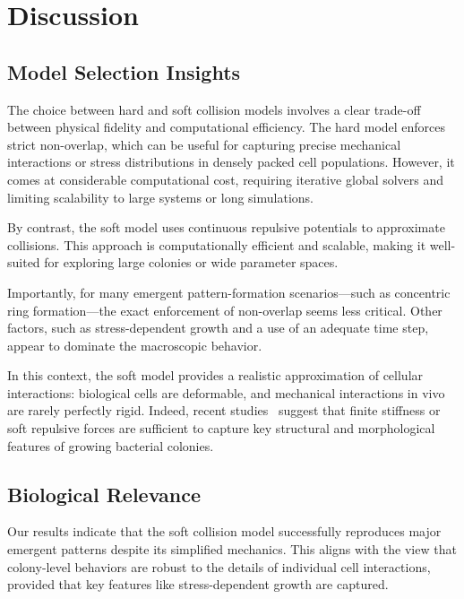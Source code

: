 \documentclass[conference]{IEEEtran}
\begin{document}
\clearpage
\newpage







\newpage
\clearpage

\section{Discussion}

\subsection{Model Selection Insights}

The choice between hard and soft collision models involves a clear trade-off between physical fidelity and computational efficiency.
The hard model enforces strict non-overlap, which can be useful for capturing precise mechanical interactions or stress distributions in densely packed cell populations. However, it comes at considerable computational cost, requiring iterative global solvers and limiting scalability to large systems or long simulations.

By contrast, the soft model uses continuous repulsive potentials to approximate collisions. This approach is computationally efficient and scalable, making it well-suited for exploring large colonies or wide parameter spaces.

Importantly, for many emergent pattern-formation scenarios—such as concentric ring formation—the exact enforcement of non-overlap seems less critical. Other factors, such as stress-dependent growth and a use of an adequate time step, appear to dominate the macroscopic behavior.

In this context, the soft model provides a realistic approximation of cellular interactions: biological cells are deformable, and mechanical interactions in vivo are rarely perfectly rigid. Indeed, recent studies~\cite{Khan_2024, Ghosh2015, SantosDiaz2025} suggest that finite stiffness or soft repulsive forces are sufficient to capture key structural and morphological features of growing bacterial colonies.

\subsection{Biological Relevance}

Our results indicate that the soft collision model successfully reproduces major emergent patterns despite its simplified mechanics. This aligns with the view that colony-level behaviors are robust to the details of individual cell interactions, provided that key features like stress-dependent growth are captured.
\end{document}
